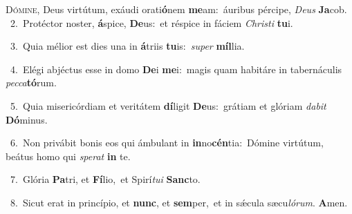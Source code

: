 \lettrine{\initial\textcolor{\initialcolor}{D}}{ómine,} Deus virtútum, exáudi orati\-\textbf{ó}\-nem \textbf{me}\-am:~\star áuribus pércipe, \textit{De}\-\textit{us} \textbf{Ja}\-cob.\\
{\numbfont\textcolor{\numbcolor}{~2.}}~Protéctor noster, \textbf{á}\-spice, \textbf{De}\-us:~\star et réspice in fáciem \textit{Chris}\-\textit{ti} \textbf{tu}\-i.\par
{\numbfont\textcolor{\numbcolor}{~3.}}~Quia mélior est dies una in \textbf{á}\-triis \textbf{tu}\-is:~\star \textit{su}\-\textit{per} \textbf{míl}\-lia.\par
{\numbfont\textcolor{\numbcolor}{~4.}}~Elégi abjéctus esse in domo \textbf{De}\-i \textbf{me}\-i:~\star magis quam habitáre in tabernáculis \textit{pec}\-\textit{ca}\textbf{tó}rum.\par
{\numbfont\textcolor{\numbcolor}{~5.}}~Quia misericórdiam et veritátem \textbf{dí}\-ligit \textbf{De}\-us:~\star grátiam et glóriam \textit{da}\-\textit{bit} \textbf{Dó}\-minus.\par
{\numbfont\textcolor{\numbcolor}{~6.}}~Non privábit bonis eos qui ámbulant in \textbf{in}\-no\-\textbf{cén}\-tia:~\star Dómine virtútum, beátus homo qui \textit{spe}\-\textit{rat} \textbf{in} te.\par
{\numbfont\textcolor{\numbcolor}{~7.}}~Glória \textbf{Pa}\-tri, et \textbf{Fí}\-lio,~\star et Spirí\-\textit{tu}\-\textit{i} \textbf{Sanc}\-to.\par
{\numbfont\textcolor{\numbcolor}{~8.}}~Sicut erat in princípio, et \textbf{nunc}\-, et \textbf{sem}\-per,~\star et in sǽcula sæcu\-\textit{ló}\-\textit{rum}. \textbf{A}\-men.\par
